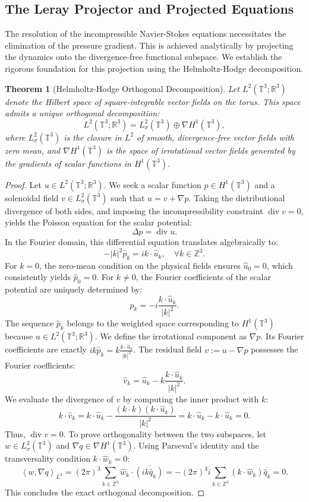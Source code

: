 \documentclass[12pt,a4paper]{article}
\theoremstyle{plain}
\newtheorem{theorem}{Theorem}[section]
\theoremstyle{definition}
\theoremstyle{remark}
\newcommand{\T}{\mathbb{T}}
\newcommand{\Z}{\mathbb{Z}}
\newcommand{\R}{\mathbb{R}}
\newcommand{\inner}[2]{\left\langle #1, #2 \right\rangle}
\newcommand{\dive}{\operatorname{div}}
\newcommand{\grad}{\nabla}
\begin{document}
\subsection{The Leray Projector and Projected Equations}
\label{subsec:leray_and_equations}

The resolution of the incompressible Navier-Stokes equations necessitates the elimination of the pressure gradient. This is achieved analytically by projecting the dynamics onto the divergence-free functional subspace. We establish the rigorous foundation for this projection using the Helmholtz-Hodge decomposition.

\begin{theorem}[Helmholtz-Hodge Orthogonal Decomposition]
\label{thm:helmholtz_hodge}
Let $L^2(\T^3; \R^3)$ denote the Hilbert space of square-integrable vector fields on the torus. This space admits a unique orthogonal decomposition:
\[
  L^2(\T^3; \R^3) = L^2_\sigma(\T^3) \oplus \grad H^1(\T^3),
\]
where $L^2_\sigma(\T^3)$ is the closure in $L^2$ of smooth, divergence-free vector fields with zero mean, and $\grad H^1(\T^3)$ is the space of irrotational vector fields generated by the gradients of scalar functions in $H^1(\T^3)$.
\end{theorem}

\begin{proof}
Let $u \in L^2(\T^3; \R^3)$. We seek a scalar function $p \in H^1(\T^3)$ and a solenoidal field $v \in L^2_\sigma(\T^3)$ such that $u = v + \grad p$. Taking the distributional divergence of both sides, and imposing the incompressibility constraint $\dive v = 0$, yields the Poisson equation for the scalar potential:
\[
  \Delta p = \dive u.
\]
In the Fourier domain, this differential equation translates algebraically to:
\[
  -|k|^2 \hat{p}_k = i k \cdot \hat{u}_k, \quad \forall k \in \Z^3.
\]
For $k = 0$, the zero-mean condition on the physical fields ensures $\hat{u}_0 = 0$, which consistently yields $\hat{p}_0 = 0$. For $k \neq 0$, the Fourier coefficients of the scalar potential are uniquely determined by:
\[
  \hat{p}_k = -i \frac{k \cdot \hat{u}_k}{|k|^2}.
\]
The sequence $\hat{p}_k$ belongs to the weighted space corresponding to $H^1(\T^3)$ because $u \in L^2(\T^3; \R^3)$. We define the irrotational component as $\grad p$. Its Fourier coefficients are exactly $i k \hat{p}_k = k \frac{k \cdot \hat{u}_k}{|k|^2}$. The residual field $v := u - \grad p$ possesses the Fourier coefficients:
\[
  \hat{v}_k = \hat{u}_k - k \frac{k \cdot \hat{u}_k}{|k|^2}.
\]
We evaluate the divergence of $v$ by computing the inner product with $k$:
\[
  k \cdot \hat{v}_k = k \cdot \hat{u}_k - \frac{(k \cdot k)(k \cdot \hat{u}_k)}{|k|^2} = k \cdot \hat{u}_k - k \cdot \hat{u}_k = 0.
\]
Thus, $\dive v = 0$. To prove orthogonality between the two subspaces, let $w \in L^2_\sigma(\T^3)$ and $\grad q \in \grad H^1(\T^3)$. Using Parseval's identity and the transversality condition $k \cdot \hat{w}_k = 0$:
\[
  \inner{w}{\grad q}_{L^2} = (2\pi)^3 \sum_{k \in \Z^3} \hat{w}_k \cdot \overline{(i k \hat{q}_k)} = -(2\pi)^3 i \sum_{k \in \Z^3} (k \cdot \hat{w}_k) \overline{\hat{q}_k} = 0.
\]
This concludes the exact orthogonal decomposition.
\end{proof}
\end{document}
